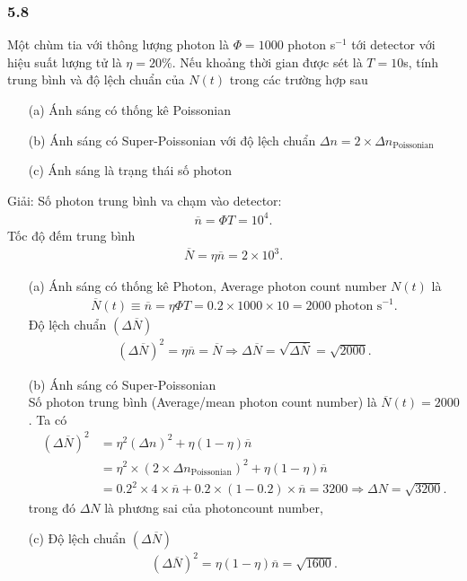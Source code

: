 \documentclass{article}
\begin{document}
\subsubsection*{5.8}
Một chùm tia với thông lượng photon là $\Phi = 1000$ photon s$^{-1}$ tới detector với hiệu suất lượng tử là $\eta = 20 \%$. Nếu khoảng thời gian được sét là $T = 10$s, tính trung bình và độ lệch chuẩn của $N(t)$ trong các trường hợp sau
\begin{enumerate}
	\item[(a)] Ánh sáng có thống kê Poissonian
	\item[(b)] Ánh sáng có Super-Poissonian với độ lệch chuẩn $\Delta n = 2\times \Delta n_{\text{Poissonian}}$
	\item[(c)] Ánh sáng là trạng thái số photon
\end{enumerate}
Giải:
Số photon trung bình va chạm vào detector:
\begin{align*}
	\overline{n} = \Phi T = 10^4.
\end{align*}
Tốc độ đếm trung bình
\begin{align*}
	\overline{N} = \eta \overline{n} = 2\times 10^3.
\end{align*}
\begin{enumerate}
	\item[(a)] Ánh sáng có thống kê Photon, Average photon count number $N(t)$ là
	      \begin{align*}
		      \overline{N}(t) \equiv \overline{n}= \eta \Phi T = 0.2 \times 1000 \times 10 = 2000 \; \text{photon s}^{-1}.
	      \end{align*}
	      Độ lệch chuẩn $(\Delta \overline{N})$
	      \begin{align*}
		      (\Delta \overline{N})^2 = \eta \overline{n} = \overline{N} \Rightarrow \Delta \overline{N} = \sqrt{\Delta \overline{N}} = \sqrt{2000}.
	      \end{align*}
	\item[(b)] Ánh sáng có Super-Poissonian\\
	      Số photon trung bình (Average/mean photon count number) là $\overline{N}(t) = 2000$. Ta có
	      \begin{align*}
		      (\Delta \overline{N})^2
		       & = \eta^2 (\Delta n)^2 + \eta ( 1 - \eta ) \overline{n} \tag{5.56 M.Fox}                                                                    \\
		       & =  \eta^2 \times (2 \times \Delta n_{\text{Poissonian}})^2 + \eta ( 1 - \eta ) \overline{n}                                                \\
		       & = 0.2^2 \times 4 \times \overline{n} + 0.2 \times (1 - 0.2) \times \overline{n} = 3200 \Rightarrow \Delta N = \sqrt{3200}. \tag{5.15 M.Fox}
	      \end{align*}
	      trong đó $\Delta N$ là phương sai của photoncount number,
	\item[(c)]
	      Độ lệch chuẩn $(\Delta \overline{N})$
	      \begin{align*}
		      (\Delta \overline{N})^2 = \eta(1-\eta) \overline{n} = \sqrt{1600}.
	      \end{align*}
\end{enumerate}
\end{document}
